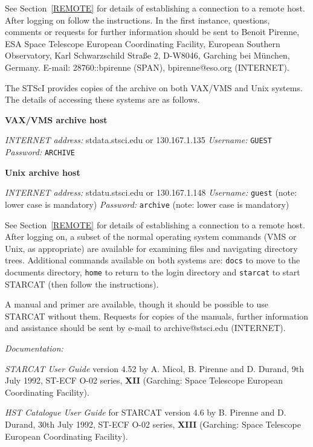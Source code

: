 \documentclass[twoside,11pt,nolof]{starlink}
\begin{document}
See Section~\ref{REMOTE} for details of establishing a connection to
a remote host. After logging on follow the instructions. In the first
instance, questions, comments or requests for further information should
be sent to Benoit Pirenne, ESA Space Telescope European Coordinating
Facility, European Southern Observatory, Karl Schwarzschild Stra\ss e 2,
D-W8046, Garching bei M\"{u}nchen, Germany. E-mail: 28760::bpirenne
(SPAN), bpirenne@eso.org (INTERNET).

The STScI provides copies of the archive on both VAX/VMS and Unix
systems. The details of accessing these systems are as follows.

\textbf{VAX/VMS archive host}

\textit{INTERNET address:} stdata.stsci.edu or 130.167.1.135
\newline \textit{Username:} \verb-GUEST-
\newline \textit{Password:} \verb-ARCHIVE-

\textbf{Unix archive host}

\textit{INTERNET address:} stdatu.stsci.edu or 130.167.1.148
\newline \textit{Username:} \verb-guest- (note: lower case is mandatory)
\newline \textit{Password:} \verb-archive- (note: lower case is mandatory)

See Section~\ref{REMOTE} for details of establishing a connection to
a remote host. After logging on, a subset of the normal operating system
commands (VMS or Unix, as appropriate) are available for examining files
and navigating directory trees. Additional commands available on both
systems are: \verb-docs- to move to the documents directory, \verb-home-
to return to the login directory and \verb-starcat- to start STARCAT
(then follow the instructions).

A manual and primer are available, though it should be possible to use
STARCAT without them. Requests for copies of the manuals, further
information and assistance should be sent by e-mail to archive@stsci.edu
(INTERNET).

\textit{Documentation:}

\textit{STARCAT User Guide} version 4.52 by A. Micol, B. Pirenne and
D. Durand, 9th July 1992, ST-ECF O-02 series, \textbf{XII} (Garching:
Space Telescope European Coordinating Facility).

\textit{HST Catalogue User Guide} for STARCAT version 4.6 by B. Pirenne and
D. Durand, 30th July 1992, ST-ECF O-02 series, \textbf{XIII} (Garching:
Space Telescope European Coordinating Facility).
\end{document}
